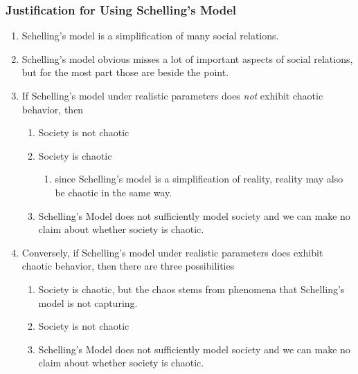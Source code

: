 \documentclass[11pt, handout]{beamer}
\begin{document}
\begin{frame}
\begin{figure}
        \end{figure}
\end{frame}


\begin{frame}
    \frametitle{Justification for Using Schelling's Model}
    \begin{enumerate}
        \item Schelling's model is a simplification of many social relations.
        \item Schelling's model obvious misses a lot of important aspects of social relations, but for the most part those are beside the point.
        \item If Schelling's model under realistic parameters does \emph{not} exhibit chaotic behavior, then
            \begin{enumerate}
                \item Society is not chaotic
                \item Society is chaotic
                    \begin{enumerate}
                        \item since Schelling's model is a simplification of reality, reality may also be chaotic in the same way.
                    \end{enumerate}
                \item Schelling's Model does not sufficiently model society and we can make no claim about whether society is chaotic.
            \end{enumerate}
        \item Conversely, if Schelling's model under realistic parameters does exhibit chaotic behavior, then there are three possibilities
            \begin{enumerate}
                \item Society is chaotic, but the chaos stems from phenomena that Schelling's model is not capturing.
                \item Society is not chaotic
                \item Schelling's Model does not sufficiently model society and we can make no claim about whether society is chaotic.
            \end{enumerate}
    \end{enumerate}
\end{frame}
\end{document}
